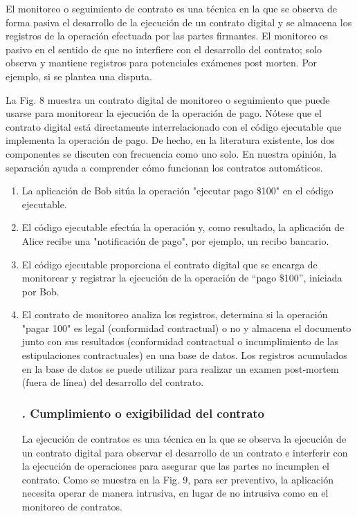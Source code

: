 \documentclass[12pt]{report} %
\begin{document}
\begin{itemize}
El monitoreo o seguimiento de contrato es una técnica en la que se observa de forma pasiva el desarrollo de la ejecución de un contrato digital y se almacena los registros de la operación efectuada por las partes firmantes. El monitoreo es pasivo en el sentido de que no interfiere con el desarrollo del contrato; solo observa y mantiene registros para potenciales exámenes post morten. Por ejemplo, si se plantea una disputa.

La Fig. 8 muestra un contrato digital de monitoreo o seguimiento que puede usarse para monitorear la ejecución de la operación de pago. Nótese que el contrato digital está directamente interrelacionado con el código ejecutable que implementa la operación de pago. De hecho, en la literatura existente, los dos componentes se discuten con frecuencia como uno solo. En nuestra opinión, la separación ayuda a comprender cómo funcionan los contratos automáticos.


 \begin{enumerate}
     \item La aplicación de Bob sitúa la operación "ejecutar pago \$100" en el código ejecutable.

     \item El código ejecutable efectúa la operación y, como resultado, la aplicación de Alice recibe una "notificación de pago", por ejemplo, un recibo bancario.

     \item El código ejecutable proporciona el contrato digital que se encarga de monitorear y registrar la ejecución de la operación de “pago \$100”, iniciada por Bob.

     \item El contrato de monitoreo analiza los registros, determina si la operación "pagar 100" es legal (conformidad contractual) o no y almacena el documento junto con sus resultados (conformidad contractual o incumplimiento de las estipulaciones contractuales) en una base de datos. Los registros acumulados en la base de datos se puede utilizar para realizar un examen post-mortem (fuera de línea) del desarrollo del contrato.

     \subsubsection{. Cumplimiento o exigibilidad del contrato}

La ejecución de contratos es una técnica en la que se observa la ejecución de un contrato digital para observar el desarrollo de un contrato e interferir con la ejecución de operaciones para asegurar que las partes no incumplen el contrato. Como se muestra en la Fig. 9, para ser preventivo, la aplicación necesita operar de manera intrusiva, en lugar de no intrusiva como en el monitoreo de contratos.


\end{enumerate}
\end{itemize}
\end{document}
